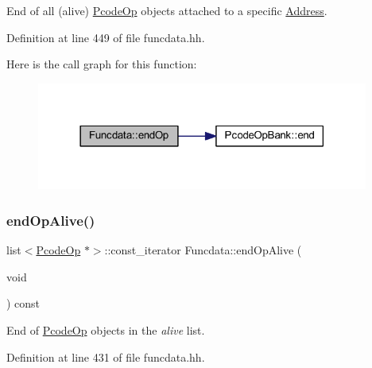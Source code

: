 End of all (alive) \mbox{\hyperlink{class_pcode_op}{Pcode\+Op}} objects attached to a specific \mbox{\hyperlink{class_address}{Address}}. 



Definition at line 449 of file funcdata.\+hh.

Here is the call graph for this function\+:
\nopagebreak
\begin{figure}[H]
\begin{center}
\leavevmode
\includegraphics[width=309pt]{class_funcdata_abd4ddbda57c4b42954ad64ddfdc0b251_cgraph}
\end{center}
\end{figure}
\mbox{\label{class_funcdata_a01a64130db5cbaaa972eed4509933870}} 
\subsubsection{\texorpdfstring{endOpAlive()}{endOpAlive()}}
{\footnotesize\ttfamily list$<$\mbox{\hyperlink{class_pcode_op}{Pcode\+Op}} $\ast$$>$\+::const\+\_\+iterator Funcdata\+::end\+Op\+Alive (\begin{DoxyParamCaption}\item[{void}]{ }\end{DoxyParamCaption}) const\hspace{0.3cm}{\ttfamily [inline]}}



End of \mbox{\hyperlink{class_pcode_op}{Pcode\+Op}} objects in the {\itshape alive} list. 



Definition at line 431 of file funcdata.\+hh.

